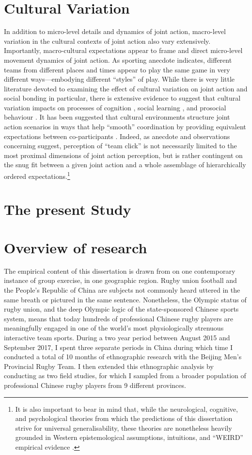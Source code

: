 \section{Cultural Variation}
In addition to micro-level details and dynamics of joint action, macro-level variation in the cultural contexts of joint action also vary extensively. Importantly, macro-cultural expectations appear to frame and direct micro-level movement dynamics of joint action.  As sporting anecdote indicates, different teams from different places and times appear to play the same game in very different ways---embodying different ``styles'' of play.  While there is very little literature devoted to examining the effect of cultural variation on joint action and social bonding in particular, there is extensive evidence to suggest that cultural variation impacts on processes of cognition \citep{Nisbett2003,Hoshino-Browne2005}, social learning \citep{Mesoudi2015}, and prosocial behaviour \citep{Yuki2005,Yuki2003}.
It has been suggested that cultural environments structure joint action scenarios in ways that help ``smooth'' coordination by providing equivalent expectations between co-participants \citep{Vesper2017}.  Indeed, as anecdote and observations concerning suggest, perception of ``team click'' is not necessarily limited to the most proximal dimensions of joint action perception, but is rather contingent on the snug fit between a given joint action and a whole assemblage of hierarchically ordered expectations.\footnote{It is also important to bear in mind that, while the neurological, cognitive, and psychological theories from which the predictions of this dissertation strive for universal generalisability, these theories are nonetheless heavily grounded in Western epistemological assumptions, intuitions, and ``WEIRD'' empirical evidence \citep{Henrich2010a}.}


\section{The present Study}
\section{Overview of research}
The empirical content of this dissertation is drawn from on one contemporary instance of group exercise, in one geographic region.  Rugby union football and the People's Republic of China are subjects not commonly heard uttered in the same breath or pictured in the same sentence.  Nonetheless, the Olympic status of rugby union, and the deep Olympic logic of the state-sponsored Chinese sports system, means that today hundreds of professional Chinese rugby players are meaningfully engaged in one of the world's most physiologically strenuous interactive team sports.  During a two year period between August 2015 and September 2017, I spent three separate periods in China during which time I conducted a total of 10 months of ethnographic research with the Beijing Men's Provincial Rugby Team.  I then extended this ethnographic analysis by conducting as two field studies, for which I sampled from a broader population of professional Chinese rugby players from 9 different provinces.

